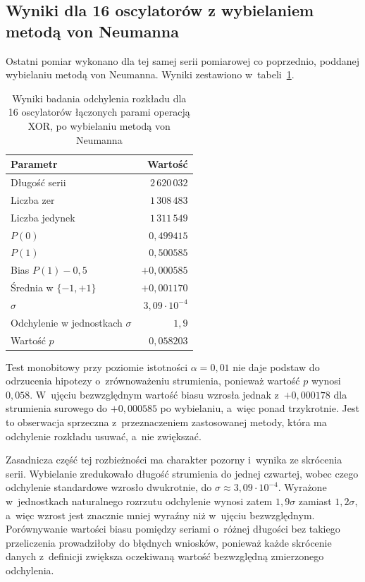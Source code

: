 \FloatBarrier

\subsection{Wyniki dla 16 oscylatorów z wybielaniem metodą von Neumanna}

Ostatni pomiar wykonano dla tej samej serii pomiarowej co poprzednio, poddanej
wybielaniu metodą von Neumanna. Wyniki zestawiono w~tabeli~\ref{tab:bias_ro16_vn}.

\begin{table}[H]
    \centering
    \caption{Wyniki badania odchylenia rozkładu dla 16 oscylatorów łączonych parami
    operacją XOR, po wybielaniu metodą von Neumanna}
    \label{tab:bias_ro16_vn}
    \small
    \begin{tabular}{lr}
        \toprule
        Parametr & Wartość \\
        \midrule
        Długość serii            & $2\,620\,032$ \\
        Liczba zer               & $1\,308\,483$ \\
        Liczba jedynek           & $1\,311\,549$ \\
        $P(0)$                   & $0{,}499415$ \\
        $P(1)$                   & $0{,}500585$ \\
        Bias $P(1)-0{,}5$        & $+0{,}000585$ \\
        Średnia w $\{-1,+1\}$    & $+0{,}001170$ \\
        $\sigma$                 & $3{,}09 \cdot 10^{-4}$ \\
        Odchylenie w jednostkach $\sigma$ & $1{,}9$ \\
        Wartość $p$              & $0{,}058203$ \\
        \bottomrule
    \end{tabular}
\end{table}

Test monobitowy przy poziomie istotności $\alpha = 0{,}01$ nie daje podstaw do
odrzucenia hipotezy o~zrównoważeniu strumienia, ponieważ wartość $p$ wynosi
$0{,}058$. W~ujęciu bezwzględnym wartość biasu wzrosła jednak z~$+0{,}000178$ dla
strumienia surowego do $+0{,}000585$ po wybielaniu, a~więc ponad trzykrotnie.
Jest to obserwacja sprzeczna z~przeznaczeniem zastosowanej metody, która ma
odchylenie rozkładu usuwać, a~nie zwiększać.

Zasadnicza część tej rozbieżności ma charakter pozorny i~wynika ze skrócenia
serii. Wybielanie zredukowało długość strumienia do jednej czwartej, wobec czego
odchylenie standardowe wzrosło dwukrotnie, do $\sigma \approx 3{,}09 \cdot 10^{-4}$.
Wyrażone w~jednostkach naturalnego rozrzutu odchylenie wynosi zatem $1{,}9\sigma$
zamiast $1{,}2\sigma$, a~więc wzrost jest znacznie mniej wyraźny niż w~ujęciu
bezwzględnym. Porównywanie wartości biasu pomiędzy seriami o~różnej długości bez
takiego przeliczenia prowadziłoby do błędnych wniosków, ponieważ każde skrócenie
danych z~definicji zwiększa oczekiwaną wartość bezwzględną zmierzonego odchylenia.

